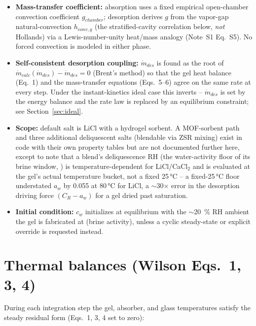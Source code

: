 \documentclass[11pt]{article}
\newcommand{\code}[1]{\texttt{\seqsplit{#1}}}
\begin{document}
\begin{itemize}
measured curve ran out of data, producing a slope discontinuity in the wettest climates. It also
applied to LiCl alone, putting a cliff at the pure-LiCl corner of the blend simplex.
\item \textbf{Mass-transfer coefficient:} absorption uses a fixed empirical open-chamber
convection coefficient $g_{chamber}$; desorption derives $g$ from the vapor-gap natural-convection
$h_{conv,g}$ (the stratified-cavity correlation below, \emph{not} Hollands) via a
Lewis-number-unity heat/mass analogy (Note~S1 Eq.~S5). No forced convection is modeled in
either phase.
\item \textbf{Self-consistent desorption coupling:} $\dot{m}_{des}$ is found as the root of
$\dot{m}_{calc}(\dot{m}_{des}) - \dot{m}_{des} = 0$ (Brent's method) so that the gel heat balance
(Eq.~1) and the mass-transfer equations (Eqs.~5--6) agree on the same rate at every step.
Under the instant-kinetics ideal case this inverts -- $\dot{m}_{des}$ is set by the energy
balance and the rate law is replaced by an equilibrium constraint; see
Section~\ref{sec:ideal}.
\item \textbf{Scope:} default salt is LiCl with a hydrogel sorbent. A MOF-sorbent path and three
additional deliquescent salts (blendable via ZSR mixing) exist in code with their own property
tables but are not documented further here, except to note that a blend's deliquescence RH (the
water-activity floor of its brine window, \code{deliquescence\_rh}) is temperature-dependent for
LiCl/CaCl$_2$ and is evaluated at the gel's actual temperature bucket, not a fixed 25\,\si{\celsius}
-- a fixed-25\,\si{\celsius} floor understated $a_w$ by 0.055 at 80\,\si{\celsius} for LiCl, a
$\sim$30$\times$ error in the desorption driving force $(C_R-a_w)$ for a gel dried past
saturation.
\item \textbf{Initial condition:} $c_w$ initializes at equilibrium with the $\sim$\SI{20}{\percent}
RH ambient the gel is fabricated at (brine activity), unless a cyclic steady-state or explicit
override is requested instead.
\end{itemize}

\section{Thermal balances (Wilson Eqs.~1, 3, 4)}\label{sec:radiative}

During each integration step the gel, absorber, and glass temperatures satisfy the steady
residual form (Eqs.~1, 3, 4 set to zero):
\end{document}
